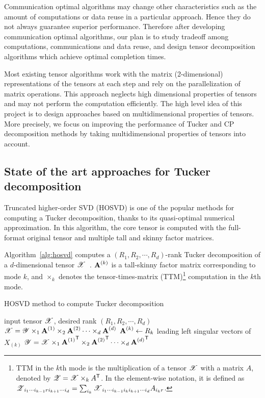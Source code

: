 \documentclass[a4paper,11pt]{article}
\newcommand{\X}{\T{X}}
\newcommand{\Y}{\T{Y}}
\newcommand{\Z}{\T{Z}}
\begin{document}
	
	Communication optimal algorithms may change other characteristics such as the amount of computations or data reuse in a particular approach. Hence they do not always guarantee superior performance. Therefore after developing communication optimal algorithms, our plan is to study tradeoff among computations, communications and data reuse, and design tensor decomposition algorithms which achieve optimal completion times.
	
	
	Most existing tensor algorithms work with the matrix (2-dimensional) representations of the tensors at each step and rely on the parallelization of matrix operations. This approach neglects high dimensional properties of tensors and may not perform the computation efficiently. The high level idea of this project is to design approaches based on multidimensional properties of tensors. More precisely, we focus on improving the performance of Tucker and CP decomposition methods by taking multidimensional properties of tensors into account.
	
	\subsection{State of the art approaches for Tucker decomposition}
	\label{sec:context:soa:Tucker}



	
	Truncated higher-order SVD (HOSVD) is one of the popular methods for computing a Tucker decomposition, thanks to its quasi-optimal numerical approximation. In this algorithm, the core tensor is computed with the full-format original tensor and multiple tall and skinny factor matrices.	
	

	
	Algorithm~\ref{alg:hosvd} computes a $(R_1, R_2, \cdots, R_d)$-rank Tucker decomposition of a $d$-dimensional tensor $\X$~\cite{KB-SIAM-2009}. $\Mn{A}{k}$ is a tall-skinny factor matrix corresponding to mode $k$, and $\times_k$ denotes the \linebreak tensor-times-matrix (TTM)\footnote{TTM in the $k$th mode is the multiplication of a tensor $\X$ with a matrix $A$, denoted by $\Z=\X \times_k A^\Tra$. In the element-wise notation, it is defined as $\Z_{i_1\cdots i_{k-1}ri_{k+1}\cdots i_d} = \sum_{i_k}\X_{i_1\cdots i_{k-1}i_ki_{k+1}\cdots i_d}A_{i_k r}$.} computation in the $k$th mode.


	\begin{algorithm}[tb]{
		\caption{HOSVD method to compute Tucker decomposition\label{alg:hosvd}}
		\begin{algorithmic}[1]
			\Require input tensor $\X$, desired rank $(R_1, R_2,\cdots, R_d)$
			\Ensure  $\X = \Y \times_1 {\Mn{A}{1}}\times_2 {\Mn{A}{2}}\cdots \times_d {\Mn{A}{d}}$
			\State $\Mn{A}{k} \gets R_k$ leading left singular vectors of $X_{(k)}$\label{alg:hosvd:SVDs}
			\EndFor
			\State $\Y = \X \times_1 {\Mn{A}{1}}^\Tra \times_2 {\Mn{A}{2}}^\Tra \cdots\times_d {\Mn{A}{d}}^\Tra$\label{alg:hosvd:multiTTM}
		\end{algorithmic}
	}\end{algorithm}
\end{document}
